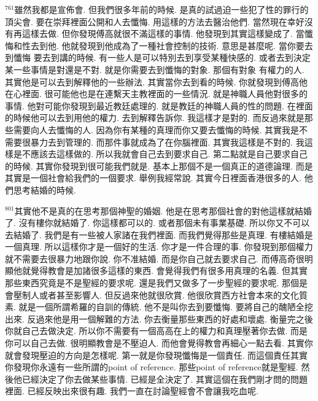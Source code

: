\documentclass{book}
\begin{document}
$^{761}$雖然我都是宣佈會.
但我們很多年前的時候.
是真的試過迫一些犯了性的罪行的頂尖會.
要在崇拜裡面公開和人去懺悔.
用這樣的方法去醫治他們.
當然現在幸好沒有再這樣去做.
但你發現傅高就很不滿這樣的事情.
他發現到其實這樣變成了.
當懺悔和性去到他.
他就發現到他成為了一種社會控制的技術.
意思是甚麼呢.
當你要去到懺悔 要去到講的時候.
有一些人是可以特別去到享受某種快感的.
或者去到決定某一些事情是對還是不對.
就是你需要去到懺悔的對象.
那個有對象 有權力的人.
其實他是可以去到解釋他的一些辦法.
其實當你去到看的時候.
你就發現到傅高他在心裡面.
很可能他也是在連繫天主教裡面的一些情況.
就是神職人員他對很多的事情.
他對可能你發現到最近教廷處理的.
就是教廷的神職人員的性的問題.
在裡面的時候他可以去到用他的權力.
去到解釋告訴你.
我這樣才是對的.
而反過來就是那些需要向人去懺悔的人.
因為你有某種的真理而你又要去懺悔的時候.
其實我是不需要很暴力去到管理的.
而那件事就成為了在你腦裡面.
其實我這樣是不對的.
我這樣是不應該去這樣做的.
所以我就會自己去到要求自己.
第二點就是自己要求自己的時候.
其實你發現到很可能我們就是.
基本上那個不是一個真正的道德論理.
而是其實是一個社會給我們的一個要求.
舉例我經常說.
其實今日裡面香港很多的人.
他們思考結婚的時候.

$^{801}$其實他不是真的在思考那個神聖的婚姻.
他是在思考那個社會的對他這樣就結婚了.
沒有樓你就結婚了.
你這樣都可以的.
或者那個未有事業基礎.
所以你又不可以去結婚了.
我們是有一些被人家諸在我們裡面.
而我們覺得那些是真理.
有樓結婚是一個真理.
所以這樣你才是一個好的生活.
你才是一件合理的事.
你發現到那個權力就不需要去很暴力地跟你說.
你不准結婚.
而是你自己就去要求自己.
而傅高奇很明顯他就覺得教會是加諸很多這樣的東西.
會覺得我們有很多用真理的名義.
但其實那些東西究竟是不是聖經的要求呢.
還是我們又做多了一步聖經的要求呢.
那個是會壓制人或者甚至影響人.
但反過來他就很欣賞.
他很欣賞西方社會本來的文化質素.
就是一個所謂希羅的自訓的傳統.
他不是叫你去到要懺悔.
要將自己的醜陋全挖出來.
反過來他是用一個解難的方法.
你去衡量那些東西的好處和壞處.
衡量完之後你就自己去做決定.
所以你不需要有一個高高在上的權力和真理壓著你去做.
而是你可以自己去做.
很明顯教會是不壓迫人.
而他會覺得教會再細心一點去看.
其實你就會發現壓迫的方向是怎樣呢.
第一就是你發現懺悔是一個責任.
而這個責任其實你發現你永遠有一些所謂的point of reference.
那些point of reference就是聖經.
然後他已經決定了你去做某些事情.
已經是全決定了.
其實這個在我們剛才問的問題裡面.
已經反映出來很有趣.
我們一直在討論聖經會不會讓我吃血呢.
\end{document}
